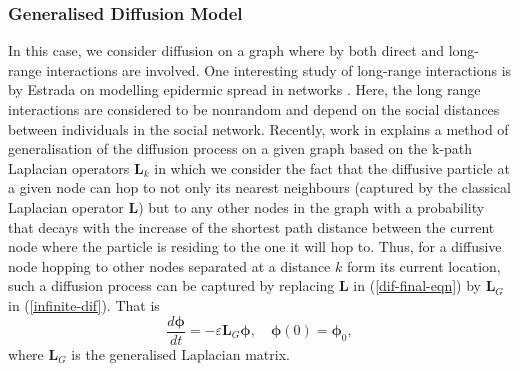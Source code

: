 \documentclass[10pt,a4paper]{article}
\begin{document}
        
        
        
        \subsubsection{Generalised Diffusion Model}
        In this case, we consider diffusion on a graph where by both direct and long-range interactions are involved. One interesting study of long-range interactions is by Estrada on modelling epidermic spread in networks \citep{estrada2011epidemic}. Here, the long range interactions are considered to be nonrandom and depend on the social distances between individuals in the social network.
        Recently, work in \citep{estrada2012path} explains a method of generalisation of the diffusion process on a given graph based on the k-path Laplacian operators $\mathbf{L}_k$ in which we consider the fact that the diffusive particle at a given node can hop to not only its nearest neighbours (captured by the classical Laplacian operator $\mathbf{L}$) but to any other nodes in the graph with a probability that decays with the increase of the shortest path distance between the current node where the particle is residing to the one it will hop to. Thus, for a diffusive node hopping to other nodes separated at a distance $k$ form its current location, such a diffusion process can be captured by replacing $\mathbf{L}$ in (\ref{dif-final-eqn}) by $\mathbf{L}_G$ in (\ref{infinite-dif}). That is 
        \begin{equation}
        \frac{d\boldsymbol{\phi}}{dt} = -\varepsilon \mathbf{L}_{G}\boldsymbol{\phi}, \quad \boldsymbol{\phi}(0) = \boldsymbol{\phi}_0 ,
        \label{gen-difeqn}
        \end{equation}
        where $\mathbf{L}_G$ is the generalised Laplacian matrix. 
        
\end{document}
